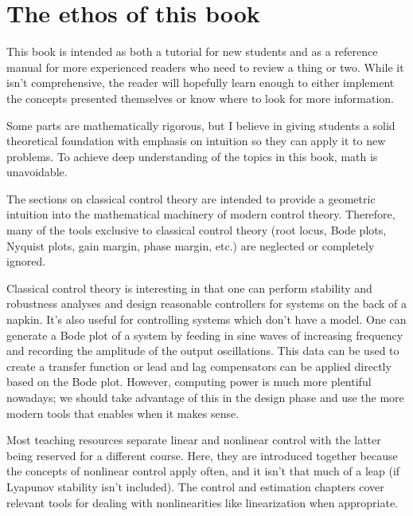 \section{The ethos of this book}

This book is intended as both a tutorial for new students and as a reference
manual for more experienced readers who need to review a thing or two. While it
isn't comprehensive, the reader will hopefully learn enough to either implement
the concepts presented themselves or know where to look for more information.

Some parts are mathematically rigorous, but I believe in giving students a solid
theoretical foundation with emphasis on intuition so they can apply it to new
problems. To achieve deep understanding of the topics in this book, math is
unavoidable.

The sections on classical control theory are intended to provide a geometric
intuition into the mathematical machinery of modern control theory. Therefore,
many of the tools exclusive to classical control theory (root locus, Bode plots,
Nyquist plots, gain margin, phase margin, etc.) are neglected or completely
ignored.

Classical control theory is interesting in that one can perform stability and
robustness analyses and design reasonable controllers for systems on the back of
a napkin. It's also useful for controlling systems which don't have a model. One
can generate a Bode plot of a system by feeding in sine waves of increasing
frequency and recording the amplitude of the output oscillations. This data can
be used to create a transfer function or lead and lag compensators can be
applied directly based on the Bode plot. However, computing power is much more
plentiful nowadays; we should take advantage of this in the design phase and use
the more modern tools that enables when it makes sense.

Most teaching resources separate linear and nonlinear control with the latter
being reserved for a different course. Here, they are introduced together
because the concepts of nonlinear control apply often, and it isn't that much of
a leap (if Lyapunov stability isn't included). The control and estimation
chapters cover relevant tools for dealing with nonlinearities like linearization
when appropriate.
